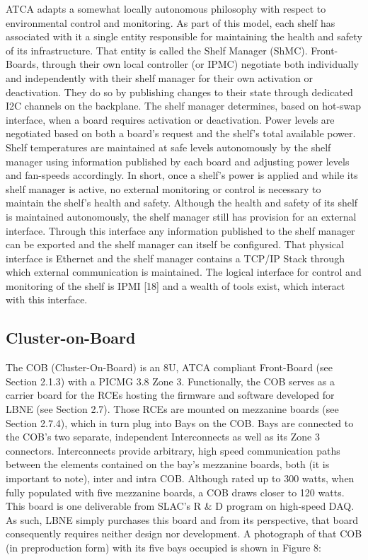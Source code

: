ATCA adapts a somewhat locally autonomous philosophy with respect to environmental control and monitoring. As part of this model, each shelf has associated with it a single entity responsible for maintaining the health and safety of its infrastructure. That entity is called the Shelf Manager (ShMC). Front-Boards, through their own local controller (or IPMC) negotiate both individually and independently with their shelf manager for their own activation or deactivation. They do so by publishing changes to their state through dedicated I2C channels on the backplane.
The shelf manager determines, based on hot-swap interface, when a board requires activation or deactivation. Power levels are negotiated based on both a board's request and the shelf's total available power. Shelf temperatures are maintained at safe levels autonomously by the shelf manager using information published by each board and adjusting power levels and fan-speeds accordingly.
In short, once a shelf's power is applied and while its shelf manager is active, no external monitoring or control is necessary to maintain the shelf's health and safety.
Although the health and safety of its shelf is maintained autonomously, the shelf manager still has provision for an external interface. Through this interface any information published to the shelf manager can be exported and the shelf manager can itself be configured. That physical interface is Ethernet and the shelf manager contains a TCP/IP Stack through which external communication is maintained. The logical interface for control and monitoring of the shelf is IPMI [18] and a wealth of tools exist, which interact with this interface.


\subsection{Cluster-on-Board}

The COB (Cluster-On-Board) is an 8U, ATCA compliant Front-Board (see Section 2.1.3) with a PICMG 3.8 Zone 3. Functionally, the COB serves as a carrier board for the RCEs hosting the firmware and software developed for LBNE (see Section 2.7). Those RCEs are mounted on mezzanine boards (see Section 2.7.4), which in turn plug into Bays on the COB. Bays are connected to the COB's two separate, independent Interconnects as well as its Zone 3 connectors. Interconnects provide arbitrary, high speed communication paths between the elements contained on the bay's mezzanine boards, both (it is important to note), inter and intra COB.
Although rated up to 300 watts, when fully populated with five mezzanine boards, a COB draws closer to 120 watts. This board is one deliverable from SLAC's R \& D program on high-speed DAQ. As such, LBNE simply purchases this board and from its perspective, that board consequently requires neither design nor development. A photograph of that COB (in preproduction form) with its five bays occupied is shown in Figure 8:


